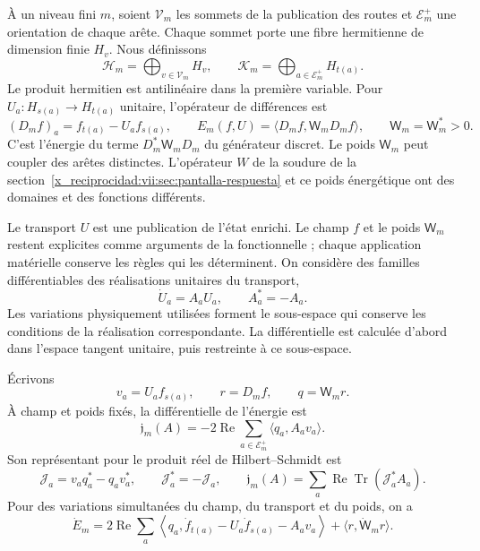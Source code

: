 À un niveau fini \(m\), soient \(\mathcal V_m\) les sommets de la
publication des routes et \(\mathcal E_m^+\) une orientation de chaque arête.
Chaque sommet porte une fibre hermitienne de dimension finie \(H_v\).
Nous définissons
\[
 \mathcal H_m=\bigoplus_{v\in\mathcal V_m}H_v,\qquad
 \mathcal K_m=\bigoplus_{a\in\mathcal E_m^+}H_{t(a)}.
\]
Le produit hermitien est antilinéaire dans la première variable.
Pour \(U_a:H_{s(a)}\to H_{t(a)}\) unitaire, l'opérateur de différences est
\begin{equation}
 (D_mf)_a=f_{t(a)}-U_af_{s(a)},\qquad
 E_m(f,U)=\langle D_mf,\mathsf W_mD_mf\rangle,\qquad
 \mathsf W_m=\mathsf W_m^*>0.
 \label{x_reciprocidad:vii:eq:energia-memoria-discreta}
\end{equation}
C'est l'énergie du terme \(D_m^*\mathsf W_mD_m\) du générateur discret.
Le poids \(\mathsf W_m\) peut coupler des arêtes distinctes. L'opérateur \(W\)
de la soudure de la section~\ref{x_reciprocidad:vii:sec:pantalla-respuesta} et ce poids
énergétique ont des domaines et des fonctions différents.

Le transport \(U\) est une publication de l'état enrichi. Le champ \(f\) et le poids \(\mathsf W_m\) restent explicites comme arguments de la fonctionnelle ; chaque application matérielle conserve les règles qui les déterminent. On considère des familles différentiables des réalisations unitaires du transport,
\[
 \dot U_a=A_aU_a,\qquad A_a^*=-A_a.
\]
Les variations physiquement utilisées forment le sous-espace qui conserve
les conditions de la réalisation correspondante. La différentielle est
calculée d'abord dans l'espace tangent unitaire, puis restreinte
à ce sous-espace.

\begin{proposition}
\label{x_reciprocidad:vii:prop:covector-memoria}
Écrivons
\[
 v_a=U_af_{s(a)},\qquad r=D_mf,\qquad q=\mathsf W_mr.
\]
À champ et poids fixés, la différentielle de l'énergie est
\begin{equation}
 \mathfrak j_m(A)=-2\operatorname{Re}
       \sum_{a\in\mathcal E_m^+}\langle q_a,A_av_a\rangle .
 \label{x_reciprocidad:vii:eq:covector-memoria}
\end{equation}
Son représentant pour le produit réel de Hilbert--Schmidt est
\begin{equation}
 \mathcal J_a=v_aq_a^*-q_av_a^*,\qquad
 \mathcal J_a^*=-\mathcal J_a,\qquad
 \mathfrak j_m(A)=
 \sum_a\operatorname{Re}\operatorname{Tr}(\mathcal J_a^*A_a).
 \label{x_reciprocidad:vii:eq:representante-corriente-discreta}
\end{equation}
Pour des variations simultanées du champ, du transport et du poids, on a
\begin{equation}
 \dot E_m=
 2\operatorname{Re}\sum_a
 \left\langle q_a,\dot f_{t(a)}-U_a\dot f_{s(a)}-A_av_a\right\rangle
 +\langle r,\dot{\mathsf W}_mr\rangle .
 \label{x_reciprocidad:vii:eq:variacion-completa-memoria}
\end{equation}
\end{proposition}

